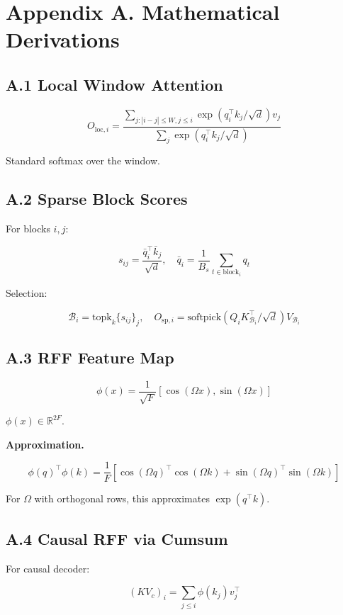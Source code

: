 
\section{Appendix A. Mathematical Derivations}

\subsection{A.1 Local Window Attention}

\[
O_{\text{loc}, i} = \frac{\sum_{j: |i - j| \leq W, j \leq i} \exp(q_i^\top k_j / \sqrt{d}) v_j}{\sum_{j} \exp(q_i^\top k_j / \sqrt{d})}
\tag{A.1}
\]

Standard softmax over the window.

\subsection{A.2 Sparse Block Scores}

For blocks $i, j$:

\[
s_{ij} = \frac{\bar{q}_i^\top \bar{k}_j}{\sqrt{d}}, \quad
\bar{q}_i = \frac{1}{B_s} \sum_{t \in \text{block}_i} q_t
\tag{A.2}
\]

Selection:

\[
\mathcal{B}_i = \text{topk}_{k}\{s_{ij}\}_j, \quad
O_{\text{sp}, i} = \text{softpick}(Q_i K_{\mathcal{B}_i}^\top / \sqrt{d}) V_{\mathcal{B}_i}
\tag{A.3}
\]

\subsection{A.3 RFF Feature Map}

\[
\phi(x) = \frac{1}{\sqrt{F}} [\cos(\Omega x), \sin(\Omega x)]
\tag{A.4}
\]

$\phi(x) \in \mathbb{R}^{2F}$.

\textbf{Approximation.}

\[
\phi(q)^\top \phi(k) = \frac{1}{F} [\cos(\Omega q)^\top \cos(\Omega k) + \sin(\Omega q)^\top \sin(\Omega k)]
\tag{A.5}
\]

For $\Omega$ with orthogonal rows, this approximates $\exp(q^\top k)$.

\subsection{A.4 Causal RFF via Cumsum}

For causal decoder:

\[
(KV_c)_i = \sum_{j \leq i} \phi(k_j) v_j^\top
\tag{A.6}
\]

